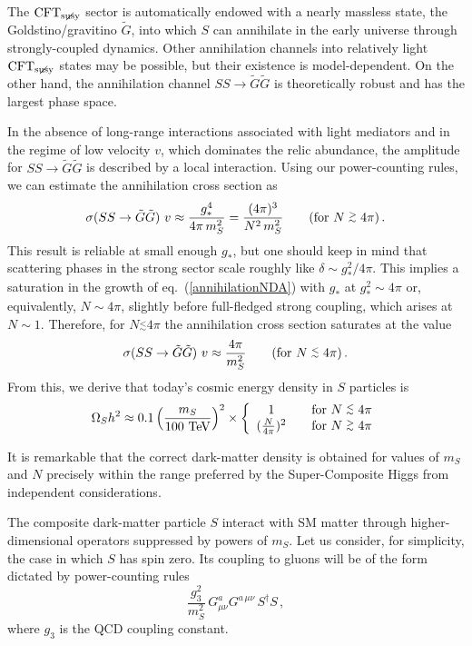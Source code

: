 \documentclass[a4paper,12pt]{article}
\newcommand{\tev}{\textrm{TeV}}
\newcommand{\lsim}{\stackrel{<}{_\sim}}
\newcommand{\gsim}{\stackrel{>}{_\sim}}
\newcommand{\beq}{\begin{equation}}
\newcommand{\eeq}{\end{equation}}
\def\eq#1{eq.~(\ref{#1})}
\def\eq#1{eq.~(\ref{#1})}
\def\mS{m_S}
\def\CFTs{{\rm CFT}_ {{\rm susy}\! \! \! \! \! \! \! \!\diagup \,\,\,}}
\begin{document}
{{{{The $\CFTs$ sector is automatically endowed with a nearly massless state, the  Goldstino/gravitino $\tilde G$, into which $S$ can annihilate in the early universe through strongly-coupled dynamics. Other annihilation channels into relatively light $\CFTs$ states may be possible, but their existence is model-dependent. On the other hand, the annihilation channel $SS\to \tilde G \tilde G$ is theoretically robust and has the largest phase space.

In the absence of long-range interactions associated with light mediators and in the regime of low velocity $v$, which dominates the relic abundance, the amplitude for $SS\to \tilde G \tilde G$ is  described by a local interaction. Using our power-counting rules, we can estimate the annihilation cross section as
\beq
\sigma(SS\to \tilde G\tilde G )~ v\approx \frac{g_*^4}{4\pi \, m_S^2}=\frac{(4\pi)^3}{N^2\, m_S^2} ~~~~~~({\rm for}~N\gsim  4\pi)
\, .
\label{annihilationNDA}
\eeq
This  result is  reliable at small enough $g_*$, but one should keep in mind that scattering phases in the strong sector scale roughly like  $\delta \sim g_*^2/4\pi$. This implies a saturation in the growth  of \eq{annihilationNDA} with $g_*$ at $g_*^2\sim 4\pi$ or, equivalently, $N\sim 4\pi$, slightly before
full-fledged strong coupling, which arises at $N\sim 1$.
Therefore, for $N\lsim 4\pi $ the annihilation cross section saturates at the value
\beq
\sigma(SS\to \tilde G\tilde G )~ v\approx \frac{4\pi }{m_S^2}~~~~~~({\rm for}~N\lsim  4\pi)
\, .
\label{annihilationMAX}
\eeq
From this, we derive that today's cosmic energy density in $S$ particles is
\beq
\Omega_S h^2 \approx 0.1 \left( \frac{\mS}{100~\tev}\right)^2\times \left\{
\begin{array}{cl}
1 & ~~~{\rm for}~N\lsim  4\pi \\
( \frac{N}{4\pi})^2& ~~~ {\rm for}~N\gsim  4\pi
\end{array} 
\right.
\eeq

It is remarkable that the correct dark-matter density is obtained for values of $\mS$ and $N$ precisely within the range preferred by the Super-Composite Higgs from independent considerations. 

The composite dark-matter particle $S$ interact with SM matter through higher-dimensional operators suppressed by powers of $\mS$. Let us consider, for simplicity, the case in which $S$ has spin zero. Its coupling to gluons will be of the form dictated by power-counting rules
\beq
\frac{g_3^2}{\mS^2}\, G^a_{\mu\nu}G^{a\, \mu\nu}\, S^\dagger S \, ,
\label{DMglu}
\eeq
where $g_3$ is the QCD coupling constant.

}}}}
\end{document}
